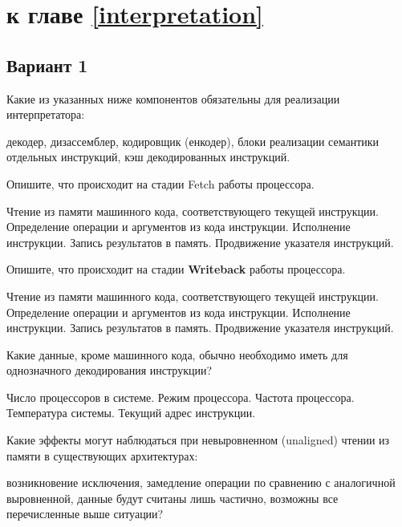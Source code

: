\section{\Questions к главе \ref{interpretation}} %

\subsection*{Вариант 1}

\begin{questions}
\question[1] Какие из указанных ниже компонентов обязательны для реализации интерпретатора:
\begin{choices}
    \correctchoice декодер,
    \choice дизассемблер,
    \choice кодировщик (енкодер),
    \correctchoice блоки реализации семантики отдельных инструкций,
    \choice кэш декодированных инструкций.
\end{choices}

\question[3] Опишите, что происходит на стадии Fetch работы процессора.
\begin{choices}
    \correctchoice Чтение из памяти машинного кода, соответствующего текущей инструкции.
    \choice Определение операции и аргументов из кода инструкции.
    \choice Исполнение инструкции.
    \choice Запись результатов в память.
    \choice Продвижение указателя инструкций.
\end{choices}

\question[3] Опишите, что происходит на стадии \textbf{Writeback} работы процессора. %
\begin{choices}
    \choice Чтение из памяти машинного кода, соответствующего текущей инструкции.
    \choice Определение операции и аргументов из кода инструкции.
    \choice Исполнение инструкции.
    \correctchoice Запись результатов в память.
    \choice Продвижение указателя инструкций.
\end{choices}

\question[3] Какие данные, кроме машинного кода, обычно необходимо иметь для однозначного декодирования инструкции?
\begin{choices}
    \choice Число процессоров в системе.
    \correctchoice Режим процессора.
    \choice Частота процессора.
    \choice Температура системы.
    \correctchoice Текущий адрес инструкции.
\end{choices}

\question[1] Какие эффекты могут наблюдаться при невыровненном (unaligned) чтении из памяти в существующих архитектурах:
\begin{choices}
    \correctchoice возникновение исключения,
    \correctchoice     замедление операции по сравнению с аналогичной выровненной,
    \choice данные будут считаны лишь частично,
    \choice  возможны все перечисленные выше ситуации?
\end{choices}


\end{questions}
